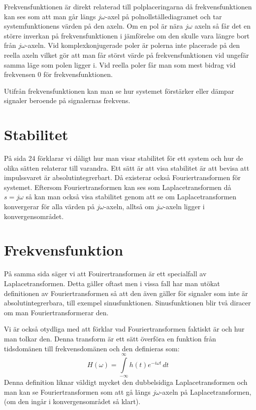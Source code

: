 \documentclass[usenames,dvipsnames]{article}
\begin{document}
Frekvensfunktionen är direkt relaterad till polplaceringarna då frekvensfunktionen kan ses som att man går längs $j\omega$-axel på polnollställediagramet och tar systemfunktionens värden på den axeln. Om en pol är nära $j\omega$ axeln så får det en större inverkan på frekvensfunktionen i jämförelse om den skulle vara längre bort från $j\omega$-axeln. Vid komplexkonjugerade poler är polerna inte placerade på den reella axeln vilket gör att man får störst värde på frekvensfunktionen vid ungefär samma läge som polen ligger i. Vid reella poler får man som mest bidrag vid frekvensen $0$ för frekvensfunktionen. 

Utifrån frekvensfunktionen kan man se hur systemet förstärker eller dämpar signaler beroende på signalernas frekvens.

\section{Stabilitet}
På sida 24 förklarar vi dåligt hur man visar stabilitet för ett system och hur de olika sätten relaterar till varandra. Ett sätt är att visa stabilitet är att bevisa att impulssvaret är absolutintegrerbart. Då existerar också Fouriertransformen för systemet. Eftersom Fouriertransformen kan ses som Laplacetransformen då $s=j\omega$ så kan man också visa stabilitet genom att se om Laplacetransformen konvergerar för alla värden på $j\omega$-axeln, alltså om $j\omega$-axeln ligger i konvergensområdet.

\section{Frekvensfunktion}
På samma sida säger vi att Fouirertransformen är ett specialfall av Laplacetransformen. Detta gäller oftast men i vissa fall har man utökat definitionen av Fouriertransformen så att den även gäller för signaler som inte är absolutintegrerbara, till exempel sinusfunktionen. Sinusfunktionen blir två diracer om man Fouriertransformerar den.

Vi är också otydliga med att förklar vad Fouriertransformen faktiskt är och hur man tolkar den. Denna transform är ett sätt överföra en funktion från tidsdomänen till frekvensdomänen och den definieras som:
$$H(\omega)=\int\limits_{-\infty}^{\infty}h(t)e^{-i\omega t}\,dt$$
Denna definition liknar väldigt mycket den dubbelsidiga Laplacetransformen och man kan se Fouriertransformen som att gå längs $j\omega$-axeln på Laplacetransformen, (om den ingår i konvergensområdet så klart).
\end{document}

